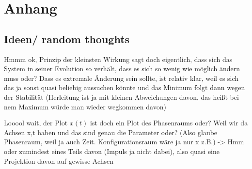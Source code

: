 




\makeindex



\pagestyle{plain.scrheadings}






\newpage



\pagestyle{plain.scrheadings}

\tableofcontents



\newpage



\listoffigures



\newpage





\pagestyle{scrheadings}













\appendix

\chapter{Anhang}

	\section{Ideen/ random thoughts}
Hmmm ok, Prinzip der kleinsten Wirkung sagt doch eigentlich, dass sich das System in seiner Evolution so verhält, dass es sich so wenig wie möglich ändern muss oder? Dass es extremale Änderung sein sollte, ist relativ klar, weil es sich das ja sonst quasi beliebig aussuchen könnte und das Minimum folgt dann wegen der Stabilität (Herleitung ist ja mit kleinen Abweichungen davon, das heißt bei nem Maximum würde man wieder wegkommen davon)


Looool wait, der Plot $x(t)$ ist doch ein Plot des Phasenraums oder? Weil wir da Achsen x,t haben und das sind genau die Parameter oder? (Also glaube Phasenraum, weil ja auch Zeit. Konfigurationsraum wäre ja nur x z.B.) -> Hmm oder zumindest eines Teils davon (Impuls ja nicht dabei), also quasi eine Projektion davon auf gewisse Achsen


